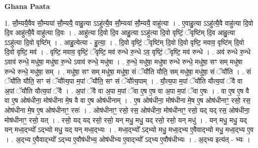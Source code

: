 \documentclass[17pt]{extarticle}
\begin{document}
\textbf{Ghana Paata } \newline

1. सौ॒म्ययै॒वैव सौ॒म्यया॑ सौ॒म्ययै॒ वाहु॒त्या ऽऽहु॑त्यै॒व सौ॒म्यया॑ सौ॒म्ययै॒ वाहु॑त्या । . ए॒वाहु॒त्या ऽऽहु॑त्यै॒वै वाहु॑त्या दि॒वो दि॒व आहु॑त्यै॒वै वाहु॑त्या दि॒वः । . आहु॑त्या दि॒वो दि॒व आहु॒त्या ऽऽहु॑त्या दि॒वो वृष्टिं॒ ॅवृष्टि॑म् दि॒व आहु॒त्या ऽऽहु॑त्या दि॒वो वृष्टि᳚म् । . आहु॒त्येत्या - हु॒त्या॒ । . दि॒वो वृष्टिं॒ ॅवृष्टि॑म् दि॒वो दि॒वो वृष्टि॒ मवाव॒ वृष्टि॑म् दि॒वो दि॒वो वृष्टि॒ मव॑ । . वृष्टि॒ मवाव॒ वृष्टिं॒ ॅवृष्टि॒ मव॑ रुन्धे रु॒न्धे ऽव॒ वृष्टिं॒ ॅवृष्टि॒ मव॑ रुन्धे । . अव॑ रुन्धे रु॒न्धे ऽवाव॑ रुन्धे॒ मधु॑षा॒ मधु॑षा रु॒न्धे ऽवाव॑ रुन्धे॒ मधु॑षा । . रु॒न्धे॒ मधु॑षा॒ मधु॑षा रुन्धे रुन्धे॒ मधु॑षा॒ सꣳ सम् मधु॑षा रुन्धे रुन्धे॒ मधु॑षा॒ सम् । . मधु॑षा॒ सꣳ सम् मधु॑षा॒ मधु॑षा॒ सं ॅयौ॑ति यौति॒ सम् मधु॑षा॒ मधु॑षा॒ सं ॅयौ॑ति । . सं ॅयौ॑ति यौति॒ सꣳ सं ॅयौ᳚त्य॒पा म॒पां ॅयौ॑ति॒ सꣳ सं ॅयौ᳚त्य॒पाम् । . यौ॒त्य॒पा म॒पां ॅयौ॑ति यौत्य॒पां ॅवै वा अ॒पां ॅयौ॑ति यौत्य॒पां ॅवै । . अ॒पां ॅवै वा अ॒पा म॒पां ॅवा ए॒ष ए॒ष वा अ॒पा म॒पां ॅवा ए॒षः । . वा ए॒ष ए॒ष वै वा ए॒ष ओष॑धीना॒ मोष॑धीना मे॒ष वै वा ए॒ष ओष॑धीनाम् । . ए॒ष ओष॑धीना॒ मोष॑धीना मे॒ष ए॒ष ओष॑धीनाꣳ॒॒ रसो॒ रस॒ ओष॑धीना मे॒ष ए॒ष ओष॑धीनाꣳ॒॒ रसः॑ । . ओष॑धीनाꣳ॒॒ रसो॒ रस॒ ओष॑धीना॒ मोष॑धीनाꣳ॒॒ रसो॒ यद् यद् रस॒ ओष॑धीना॒ मोष॑धीनाꣳ॒॒ रसो॒ यत् । . रसो॒ यद् यद् रसो॒ रसो॒ यन् मधु॒ मधु॒ यद् रसो॒ रसो॒ यन् मधु॑ । . यन् मधु॒ मधु॒ यद् यन् मध्व॒द्भ्यो᳚ ऽद्भ्यो मधु॒ यद् यन् मध्व॒द्भ्यः । . मध्व॒द्भ्यो᳚ ऽद्भ्यो मधु॒ मध्व॒द्भ्य ए॒वैवाद्भ्यो मधु॒ मध्व॒द्भ्य ए॒व । . अ॒द्भ्य ए॒वैवाद्भ्यो᳚ ऽद्भ्य ए॒वौष॑धीभ्य॒ ओष॑धीभ्य ए॒वाद्भ्यो᳚ ऽद्भ्य ए॒वौष॑धीभ्यः । . अ॒द्भ्य इत्य॑त् - भ्यः । \newline
\end{document}
